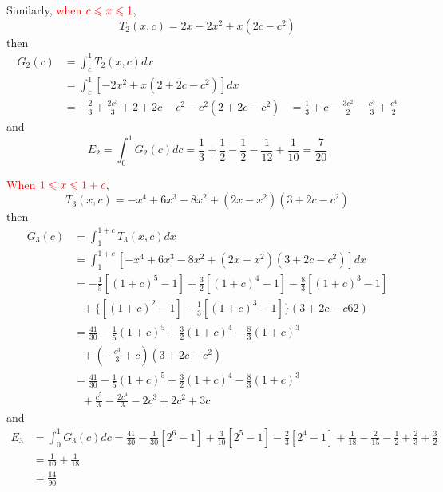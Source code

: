 \documentclass[12pt]{simple_doc}
\begin{document}
    Similarly, \textcolor{red}{when} $\color{red} c \leqslant x \leqslant 1$,
    \begin{equation*}
        T_2(x, c) = 2x - 2x^2 + x(2c - c^2)
    \end{equation*}
    then
    \begin{equation*}
		\begin{aligned}
		G_2(c) &= \int_c^1 T_2(x, c) dx \\
		   &= \int_c^1 [- 2x^2 + x(2 + 2c - c^2)] dx\\
           &= -\frac{2}{3} + \frac{2c^3}{3} + 2 + 2c -c^2 -c^2(2 + 2c - c^2)
           &= \frac{1}{3} + c - \frac{3c^2}{2} - \frac{c^3}{3} + \frac{c^4}{2}
		\end{aligned}
    \end{equation*}
    and
    \begin{equation*}
        E_2 = \int_0^1 G_2(c)dc = \frac{1}{3} + \frac{1}{2}  - \frac{1}{2}
            - \frac{1}{12} + \frac{1}{10} = \frac{7}{20}
    \end{equation*}

    \textcolor{red}{When} $\color{red} 1 \leqslant x \leqslant 1 + c$,
    \begin{equation*}
        T_3(x, c) = -x^4 +6x^3 -8x^2 + (2x - x^2)(3 + 2c - c^2)
    \end{equation*}
    then
    \begin{equation*}
		\begin{aligned}
		G_3(c) &= \int_1^{1+c} T_3(x, c) dx \\
		   &= \int_1^{1+c} [-x^4 +6x^3 -8x^2 + (2x - x^2)(3 + 2c - c^2)] dx\\
           &= -\frac{1}{5}[(1+c)^5 - 1] + \frac{3}{2}[(1+c)^4 - 1] - \frac{8}{3}[(1+c)^3 - 1]\\
           &\ \ \ + \{[(1+c)^2 - 1] - \frac{1}{3}[(1+c)^3 - 1]\}(3 + 2c - c62)\\
           &= \frac{41}{30} - \frac{1}{5}(1+c)^5 + \frac{3}{2}(1+c)^4 - \frac{8}{3}(1+c)^3\\
           &\ \ \ + (-\frac{c^3}{3} + c)(3 + 2c - c^2)\\
           &= \frac{41}{30} - \frac{1}{5}(1+c)^5 + \frac{3}{2}(1+c)^4 - \frac{8}{3}(1+c)^3\\
           &\ \ \ + \frac{c^5}{3} - \frac{2c^4}{3} -2c^3 + 2c^2 + 3c
		\end{aligned}
    \end{equation*}
    and
    \begin{equation*}
        \begin{aligned}
        E_3 &= \int_0^1 G_3(c)dc = \frac{41}{30} - \frac{1}{30}[2^6 - 1] + \frac{3}{10}[2^5 - 1]
                - \frac{2}{3}[2^4 - 1] + \frac{1}{18} - \frac{2}{15} - \frac{1}{2}
                + \frac{2}{3} + \frac{3}{2}\\
            &= \frac{1}{10} + \frac{1}{18}\\
            &= \frac{14}{90}
        \end{aligned}
    \end{equation*}
\end{document}
